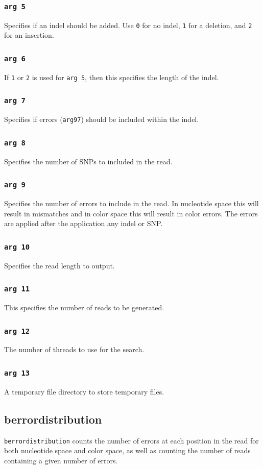 \documentclass[a4paper,12pt]{book}
\newcommand{\TT}[1]{{\tt #1}} %
\begin{document}
\subsubsection{\TT{arg 5}}
Specifies if an indel should be added.
Use \TT{0} for no indel, \TT{1} for a deletion, and \TT{2} for an insertion.
\subsubsection{\TT{arg 6}}
If \TT{1} or \TT{2} is used for \TT{arg 5}, then this specifies the length of the indel.
\subsubsection{\TT{arg 7}}
Specifies if errors (\TT{arg97}) should be included within the indel. 
\subsubsection{\TT{arg 8}}
Specifies the number of SNPs to included in the read.
\subsubsection{\TT{arg 9}}
Specifies the number of errors to include in the read.
In nucleotide space this will result in mismatches and in color space this will result in color errors.
The errors are applied after the application any indel or SNP.
\subsubsection{\TT{arg 10}}
Specifies the read length to output.
\subsubsection{\TT{arg 11}}
This specifies the number of reads to be generated.
\subsubsection{\TT{arg 12}}
The number of threads to use for the search.
\subsubsection{\TT{arg 13}}
A temporary file directory to store temporary files.


\subsection{berrordistribution}
\label{sec:berrordistribution}
\TT{berrordistribution} counts the number of errors at each position in the read for both nucleotide space and color space, as well as counting the number of reads containing a given number of errors.
\end{document}
